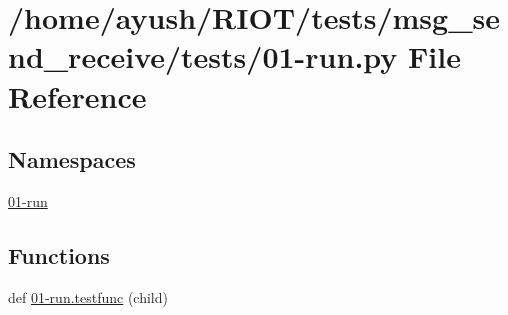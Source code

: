 \hypertarget{msg__send__receive_2tests_201-run_8py}{}\section{/home/ayush/\+R\+I\+O\+T/tests/msg\+\_\+send\+\_\+receive/tests/01-\/run.py File Reference}
\label{msg__send__receive_2tests_201-run_8py}
\subsection*{Namespaces}
\begin{DoxyCompactItemize}
\item 
 \hyperlink{namespace01-run}{01-\/run}
\end{DoxyCompactItemize}
\subsection*{Functions}
\begin{DoxyCompactItemize}
\item 
def \hyperlink{namespace01-run_aff983ffd4ab0e6bf8e7e58970e4a10bb}{01-\/run.\+testfunc} (child)
\end{DoxyCompactItemize}
